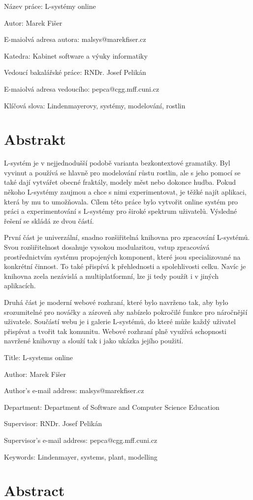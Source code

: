 
{
\setlength\parindent{0mm}
\setlength\parskip{5mm}

Název práce: L-systémy online

Autor: Marek Fišer

E-maiolvá adresa autora: malsys@marekfiser.cz

Katedra: Kabinet software a výuky informatiky

Vedoucí bakalářské práce: RNDr. Josef Pelikán

E-maiolvá adresa vedoucího: pepca@cgg.mff.cuni.cz

Klíčová slova: Lindenmayerovy, systémy, modelování, rostlin

\section*{Abstrakt}
}
\mbox{L-systém} je v nejjednodušší podobě varianta bezkontextové gramatiky.
Byl vyvi\-nut a používá se hlavně pro modelování růstu rostlin, ale s jeho pomocí se také dají vytvářet obecné fraktály, modely měst nebo dokonce hudba.
Pokud někoho \mbox{L-systémy} zaujmou a chce s nimi experimentovat, je těžké najít aplikaci, která by mu to umožňovala.
Cílem této práce bylo vytvořit online systém pro práci a experimentování s L-systémy pro široké spektrum uživatelů.
Výsledné řešení se skládá ze dvou částí.

První část je univerzální, snadno rozšiřitelná knihovna pro zpracování \mbox{L-sys}\-témů.
Svou rozšiřitelnost dosahuje vysokou modularitou, vstup zpracovává pros\-třednic\-tvím systému propojených komponent, které jsou specializované na kon\-krét\-ní činnost.
To také přispívá k přehlednosti a spolehlivosti celku.
Navíc je knihovna zcela nezávislá a multiplatformní, lze ji tedy použít i v jiných aplikacích.

Druhá část je moderní webové rozhraní, které bylo navrženo tak, aby bylo srozumitelné pro nováčky a zároveň aby nabízelo pokročilé funkce pro nároč\-nější uživatele.
Součástí webu je i galerie L-systémů, do které může každý uživatel přispívat a tvořit tak komunitu.
Webové rozhraní plně využívá schopnosti navr\-žené knihovny a slouží tak i jako ukázka jejího použití.

\newpage

{
\setlength\parindent{0mm}
\setlength\parskip{5mm}

Title: L-systems online

Author: Marek Fišer

Author's e-mail address: malsys@marekfiser.cz

Department: Department of Software and Computer Science Education

Supervisor: RNDr. Josef Pelikán

Supervisor's e-mail address: pepca@cgg.mff.cuni.cz

Keywords: Lindenmayer, systems, plant, modelling

\section*{Abstract}
}



